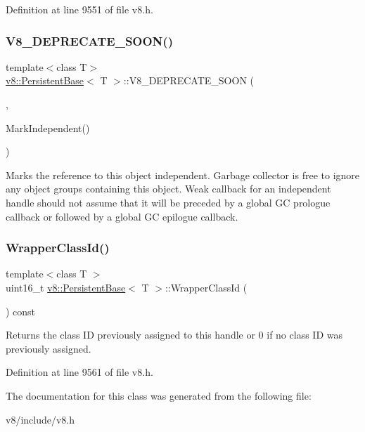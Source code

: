 Definition at line 9551 of file v8.\+h.

\mbox{\label{classv8_1_1PersistentBase_a760df2921447e2344ec564d0268d9d1c}} 
\subsubsection{\texorpdfstring{V8\+\_\+\+D\+E\+P\+R\+E\+C\+A\+T\+E\+\_\+\+S\+O\+O\+N()}{V8\_DEPRECATE\_SOON()}}
{\footnotesize\ttfamily template$<$class T$>$ \\
\mbox{\hyperlink{classv8_1_1PersistentBase}{v8\+::\+Persistent\+Base}}$<$ T $>$\+::V8\+\_\+\+D\+E\+P\+R\+E\+C\+A\+T\+E\+\_\+\+S\+O\+ON (\begin{DoxyParamCaption}\item[{\char`\"{}Objects are always considered independent. \char`\"{} \char`\"{}Use \mbox{\hyperlink{classv8_1_1PersistentBase_a7244edd33a45b7d95e566fce85e3f87d}{Mark\+Active}} to avoid collecting otherwise dead weak handles.\char`\"{}}]{,  }\item[{V8\+\_\+\+I\+N\+L\+I\+NE void }]{Mark\+Independent() }\end{DoxyParamCaption})}

Marks the reference to this object independent. Garbage collector is free to ignore any object groups containing this object. Weak callback for an independent handle should not assume that it will be preceded by a global GC prologue callback or followed by a global GC epilogue callback. \mbox{\label{classv8_1_1PersistentBase_ac81668d70faff8ee84aa6db410b3ce3c}} 
\subsubsection{\texorpdfstring{Wrapper\+Class\+Id()}{WrapperClassId()}}
{\footnotesize\ttfamily template$<$class T $>$ \\
uint16\+\_\+t \mbox{\hyperlink{classv8_1_1PersistentBase}{v8\+::\+Persistent\+Base}}$<$ T $>$\+::Wrapper\+Class\+Id (\begin{DoxyParamCaption}{ }\end{DoxyParamCaption}) const}

Returns the class ID previously assigned to this handle or 0 if no class ID was previously assigned. 

Definition at line 9561 of file v8.\+h.



The documentation for this class was generated from the following file\+:\begin{DoxyCompactItemize}
\item 
v8/include/v8.\+h\end{DoxyCompactItemize}
